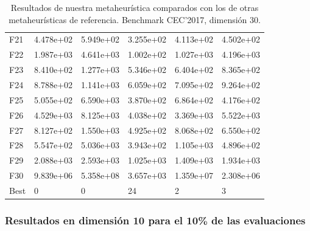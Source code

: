 \documentclass{article}
\begin{document}
\begin{table}[H]
\begin{tabular}{|l|lllll|}
	F21  &  4.478e+02 &  5.949e+02 &  3.255e+02 &  4.113e+02 &  4.502e+02 \\
	F22  &  1.987e+03 &  4.641e+03 &  1.002e+02 &  1.027e+03 &  4.196e+03 \\
	F23  &  8.410e+02 &  1.277e+03 &  5.346e+02 &  6.404e+02 &  8.365e+02 \\
	F24  &  8.788e+02 &  1.141e+03 &  6.059e+02 &  7.095e+02 &  9.264e+02 \\
	F25  &  5.055e+02 &  6.590e+03 &  3.870e+02 &  6.864e+02 &  4.176e+02 \\
	F26  &  4.529e+03 &  8.125e+03 &  4.038e+02 &  3.369e+03 &  5.522e+03 \\
	F27  &  8.127e+02 &  1.550e+03 &  4.925e+02 &  8.068e+02 &  6.550e+02 \\
	F28  &  5.547e+02 &  5.036e+03 &  3.943e+02 &  1.105e+03 &  4.896e+02 \\
	F29  &  2.088e+03 &  2.593e+03 &  1.025e+03 &  1.409e+03 &  1.934e+03 \\
	F30  &  9.839e+06 &  5.358e+08 &  3.657e+03 &  1.359e+07 &  2.308e+06 \\ \hline
	Best &          0 &          0 &         24 &          2 &          3 \\
	\hline
\end{tabular}
	\caption{Resultados de nuestra metaheurística comparados con los de otras metaheurísticas de referencia. Benchmark CEC'2017, dimensión 30.}
	\label{tab:branch-30}
\end{table}


\subsubsection*{Resultados en dimensión 10 para el 10\% de las evaluaciones}
\end{document}
